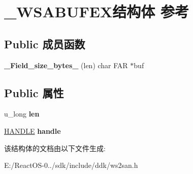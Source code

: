 \hypertarget{struct___w_s_a_b_u_f_e_x}{}\section{\+\_\+\+W\+S\+A\+B\+U\+F\+E\+X结构体 参考}
\label{struct___w_s_a_b_u_f_e_x}
\subsection*{Public 成员函数}
\begin{DoxyCompactItemize}
\item 
\mbox{\label{struct___w_s_a_b_u_f_e_x_ad18c20ddb56ed659068eedfed6a35e02}} 
{\bfseries \+\_\+\+Field\+\_\+size\+\_\+bytes\+\_\+} (len) char F\+AR $\ast$buf
\end{DoxyCompactItemize}
\subsection*{Public 属性}
\begin{DoxyCompactItemize}
\item 
\mbox{\label{struct___w_s_a_b_u_f_e_x_a30766f339f5dce61c23fc84f33ff1918}} 
u\+\_\+long {\bfseries len}
\item 
\mbox{\label{struct___w_s_a_b_u_f_e_x_af4631280d32910cf81b4e2b635eb641f}} 
\hyperlink{interfacevoid}{H\+A\+N\+D\+LE} {\bfseries handle}
\end{DoxyCompactItemize}


该结构体的文档由以下文件生成\+:\begin{DoxyCompactItemize}
\item 
E\+:/\+React\+O\+S-\/0../sdk/include/ddk/ws2san.\+h\end{DoxyCompactItemize}
